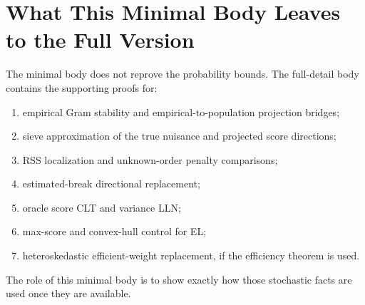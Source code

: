 \documentclass[12pt]{article}
\numberwithin{equation}{section}
\theoremstyle{definition}
\begin{document}
\section{What This Minimal Body Leaves to the Full Version}

The minimal body does not reprove the probability bounds. The full-detail body
contains the supporting proofs for:
\begin{enumerate}[leftmargin=2em]
\item empirical Gram stability and empirical-to-population projection bridges;
\item sieve approximation of the true nuisance and projected score directions;
\item RSS localization and unknown-order penalty comparisons;
\item estimated-break directional replacement;
\item oracle score CLT and variance LLN;
\item max-score and convex-hull control for EL;
\item heteroskedastic efficient-weight replacement, if the efficiency theorem is
used.
\end{enumerate}
The role of this minimal body is to show exactly how those stochastic facts are
used once they are available.
\end{document}
